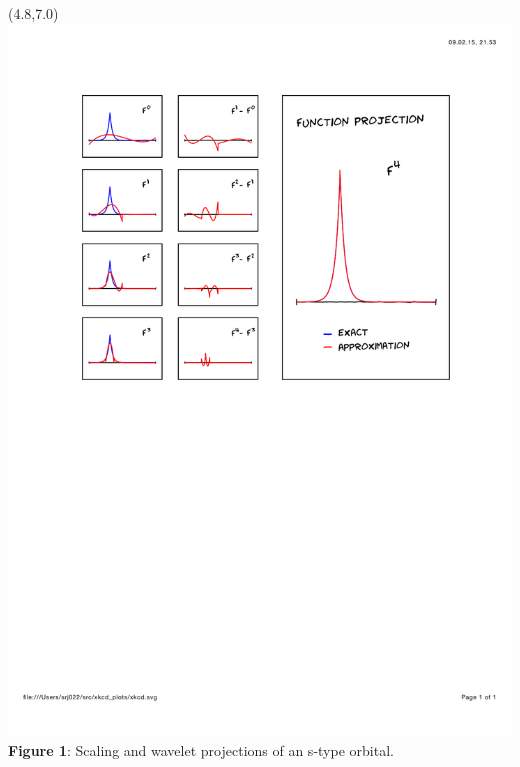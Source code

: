 \documentclass[a0,draft,portrait]{a0poster}
\begin{document}
\begin{textblock}{4.5}(4.8,7.0)
    \includegraphics[scale=1.3, viewport = 85 400 550 760, clip]{figures/func_rep_2.pdf}
    \footnotesize
    \centering
    \\\textbf{Figure 1}: Scaling and wavelet projections of an s-type orbital.
\end{textblock} 
\end{document}
